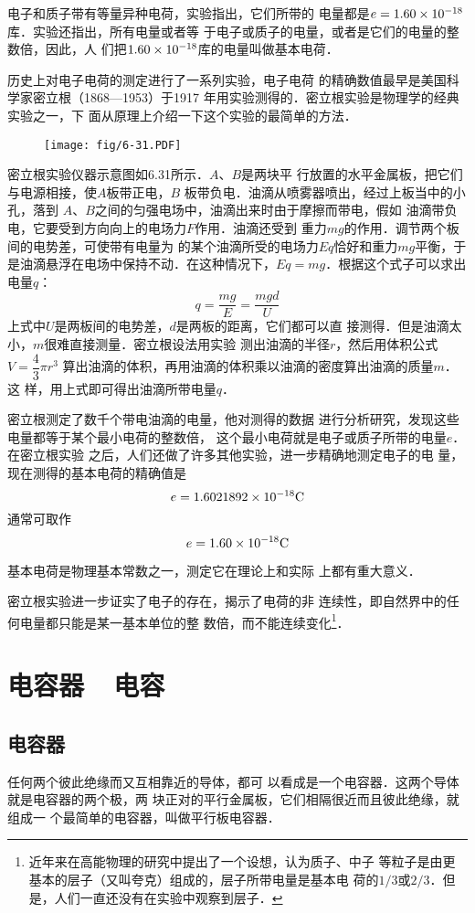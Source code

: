 电子和质子带有等量异种电荷，实验指出，它们所带的
电量都是$e=1.60\times10^{-18}$库．实验还指出，所有电量或者等
于电子或质子的电量，或者是它们的电量的整数倍，因此，人
们把$1.60\times10^{-18}$库的电量叫做基本电荷．

历史上对电子电荷的测定进行了一系列实验，电子电荷
的精确数值最早是美国科学家密立根（1868—1953）于1917
年用实验测得的．密立根实验是物理学的经典实验之一，下
面从原理上介绍一下这个实验的最简单的方法．

\begin{figure}[htp]\centering
\texttt{[image: fig/6-31.PDF]}
\caption{}
\end{figure}

密立根实验仪器示意图如6.31所示．$A$、$B$是两块平
行放置的水平金属板，把它们与电源相接，使$A$板带正电，$B$
板带负电．油滴从喷雾器喷出，经过上板当中的小孔，落到
$A$、$B$之间的匀强电场中，油滴出来时由于摩擦而带电，假如
油滴带负电，它要受到方向向上的电场力$F$作用．油滴还受到
重力$mg$的作用．调节两个板间的电势差，可使带有电量为
的某个油滴所受的电场力$Eq$恰好和重力$mg$平衡，于是油滴悬浮在电场中保持不动．在这种情况下，$Eq=
mg$．根据这个式子可以求出电量$q$：
\[q=\frac{mg}{E}=\frac{mgd}{U}  \]
上式中$U$是两板间的电势差，$d$是两板的距离，它们都可以直
接测得．但是油滴太小，$m$很难直接测量．密立根设法用实验
测出油滴的半径$r$，然后用体积公式$V=\dfrac{4}{3}\pi r^3$
算出油滴的体积，再用油滴的体积乘以油滴的密度算出油滴的质量$m$．这
样，用上式即可得出油滴所带电量$q$．

密立根测定了数千个带电油滴的电量，他对测得的数据
进行分析研究，发现这些电量都等于某个最小电荷的整数倍，
这个最小电荷就是电子或质子所带的电量$e$．在密立根实验
之后，人们还做了许多其他实验，进一步精确地测定电子的电
量，现在测得的基本电荷的精确值是
\[e=1.6021892\times10^{-18}{\rm C}\]
通常可取作
\[e=1.60\times10^{-18}{\rm C}\]

基本电荷是物理基本常数之一，测定它在理论上和实际
上都有重大意义．

密立根实验进一步证实了电子的存在，揭示了电荷的非
连续性，即自然界中的任何电量都只能是某一基本单位的整
数倍，而不能连续变化\footnote{近年来在高能物理的研究中提出了一个设想，认为质子、中子
等粒子是由更基本的层子（又叫夸克）组成的，层子所带电量是基本电
荷的$1/3$或$2/3$．但是，人们一直还没有在实验中观察到层子．}．

\section{电容器~~电容}
\subsection{电容器}
任何两个彼此绝缘而又互相靠近的导体，都可
以看成是一个电容器．这两个导体就是电容器的两个极，两
块正对的平行金属板，它们相隔很近而且彼此绝缘，就组成一
个最简单的电容器，叫做平行板电容器．

